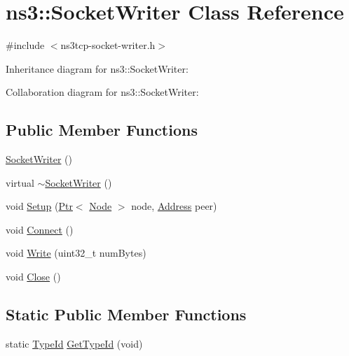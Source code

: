 \hypertarget{classns3_1_1SocketWriter}{}\section{ns3\+:\+:Socket\+Writer Class Reference}
\label{classns3_1_1SocketWriter}


{\ttfamily \#include $<$ns3tcp-\/socket-\/writer.\+h$>$}



Inheritance diagram for ns3\+:\+:Socket\+Writer\+:


Collaboration diagram for ns3\+:\+:Socket\+Writer\+:
\subsection*{Public Member Functions}
\begin{DoxyCompactItemize}
\item 
\hyperlink{classns3_1_1SocketWriter_a132e28853f1018b462fbde96e2b6df27}{Socket\+Writer} ()
\item 
virtual \hyperlink{classns3_1_1SocketWriter_af9b1bb7b833f16c4025453b34b79980a}{$\sim$\+Socket\+Writer} ()
\item 
void \hyperlink{classns3_1_1SocketWriter_a79db65c3883555f22681d8ffabd206e4}{Setup} (\hyperlink{classns3_1_1Ptr}{Ptr}$<$ \hyperlink{classns3_1_1Node}{Node} $>$ node, \hyperlink{classns3_1_1Address}{Address} peer)
\item 
void \hyperlink{classns3_1_1SocketWriter_a63dcac21fa9f86360fc666a3d15058fc}{Connect} ()
\item 
void \hyperlink{classns3_1_1SocketWriter_a8fd5c60d718d8e52b1861a760b25decb}{Write} (uint32\+\_\+t num\+Bytes)
\item 
void \hyperlink{classns3_1_1SocketWriter_aa25550d507c11887d4bfb38b3021b221}{Close} ()
\end{DoxyCompactItemize}
\subsection*{Static Public Member Functions}
\begin{DoxyCompactItemize}
\item 
static \hyperlink{classns3_1_1TypeId}{Type\+Id} \hyperlink{classns3_1_1SocketWriter_a85e43b753f0575e8621678fc7caf9a0b}{Get\+Type\+Id} (void)
\end{DoxyCompactItemize}
